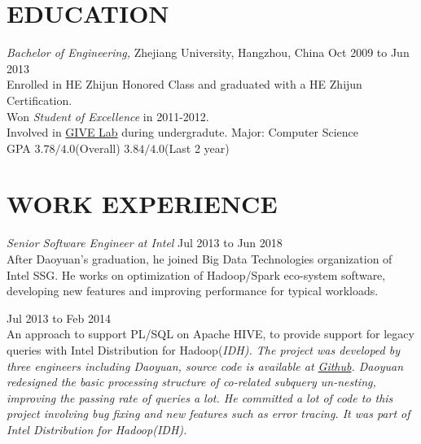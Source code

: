\documentclass[line,margin]{res}
\begin{document}
\address{Cellphone:\sl +86-152-1686-1267}
\address{E-mail:\sl me at daoyuan.wang}


\begin{resume}

\section{EDUCATION} {\sl Bachelor of Engineering,} Zhejiang University, Hangzhou, China \hfill Oct 2009 to Jun 2013\\
                Enrolled in HE Zhijun Honored Class and graduated with a HE Zhijun Certification.\\
                Won {\sl Student of Excellence} in 2011-2012.\\
                Involved in \href{http://give.zju.edu.cn/en/portal/index.html}{GIVE Lab} during undergradute.
                Major: Computer Science \\
                GPA $3.78/4.0$(Overall) $3.84/4.0$(Last 2 year)

\section{WORK EXPERIENCE}
    {\sl Senior Software Engineer at Intel} \hfill         Jul 2013 to Jun 2018\\
    After Daoyuan's graduation, he joined Big Data Technologies organization of Intel SSG. He works on optimization of Hadoop/Spark eco-system software, developing new features and improving performance for typical workloads.
        \begin{outline}
             \hfill        Jul 2013 to Feb 2014\\
                An approach to support PL/SQL on Apache HIVE, to provide support for legacy queries with Intel Distribution for Hadoop(\sl IDH). The project was developed by three engineers including Daoyuan, source code is available at \href{https://github.com/intel-hadoop/project-panthera}{Github}. Daoyuan redesigned the basic processing structure of co-related subquery un-nesting, improving the passing rate of queries a lot. He committed a lot of code to this project involving bug fixing and new features such as error tracing. It was part of Intel Distribution for Hadoop(\sl IDH).


\end{outline}
\end{resume}
\end{document}
